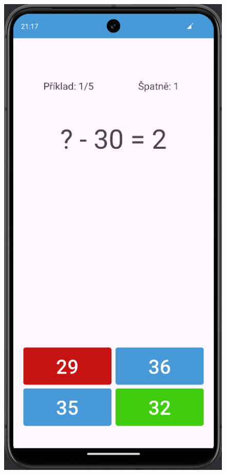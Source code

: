 \documentclass[12pt]{report}
\begin{document}
	\begin{figure}[ht]
		\centering
		\begin{minipage}{.5\textwidth}
			\centering
			\includegraphics[height=1.7\textwidth]{img/exercise_1}
			\label{fig:exercise_1}
		\end{minipage}%
		\hfill
		\begin{minipage}{.5\textwidth}
			\centering

\end{minipage}
\end{figure}
\end{document}
